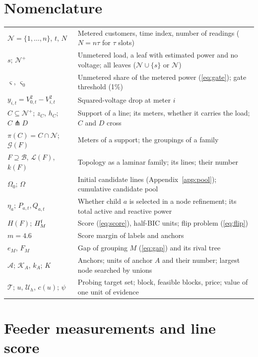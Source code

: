 \documentclass[journal,onecolumn,11pt]{IEEEtran}
\newcommand{\Lin}{\mathcal{L}}
\newcommand{\Nset}{\mathcal{N}}
\newcommand{\Bset}{\mathcal{B}}
\newcommand{\Tset}{\mathcal{T}}
\newcommand{\Uset}{\mathcal{U}}
\newcommand{\Aset}{\mathcal{A}}
\newcommand{\Kset}{\mathcal{K}}
\newcommand{\Gset}{\mathcal{G}}
\newcommand{\cross}{\pitchfork}
\begin{document}
\section*{Nomenclature}
\begin{tabular}{@{}p{}p{}@{}}
\toprule
$\Nset=\{1,\dots,n\}$, $t$, $N$ & Metered customers, time index, number of readings ($N=n\tau$ for $\tau$ slots)\\
$s$; $\Nset^+$ & Unmetered load, a leaf with estimated power and no voltage; all leaves ($\Nset\cup\{s\}$ or $\Nset$)\\
$\varsigma$, $\varsigma_0$ & Unmetered share of the metered power (\ref{eq:gate}); gate threshold (1\%)\\
$y_{i,t}=V_{0,t}^2-V_{i,t}^2$ & Squared-voltage drop at meter $i$\\
$C\subseteq\Nset^+$; $z_C$, $h_C$; $C\cross D$ & Support of a line; its meters, whether it carries the load; $C$ and $D$ cross\\
$\pi(C)=C\cap\Nset$; $\Gset(F)$ & Meters of a support; the groupings of a family\\
$F\supseteq\Bset$, $\Lin(F)$, $k(F)$ & Topology as a laminar family; its lines; their number\\
$\Omega_0$; $\Omega$ & Initial candidate lines (Appendix~\ref{app:pool}); cumulative candidate pool\\
$\eta_a$; $P_{a,t},Q_{a,t}$ & Whether child $a$ is selected in a node refinement; its total active and reactive power\\
$H(F)$; $H^{\rm f}_M$ & Score (\ref{eq:score}), half-BIC units; flip problem (\ref{eq:flip})\\
$m=4.6$ & Score margin of labels and anchors\\
$e_M$, $F_M$ & Gap of grouping $M$ (\ref{eq:gap}) and its rival tree\\
$\Aset$; $\Kset_A$, $k_A$; $K$ & Anchors; units of anchor $A$ and their number; largest node searched by unions\\
$\Tset$; $u$, $\Uset_h$, $c(u)$; $\psi$ & Probing target set; block, feasible blocks, price; value of one unit of evidence\\
\bottomrule
\end{tabular}

\section{Feeder measurements and line score}\label{sec:model}
\end{document}
